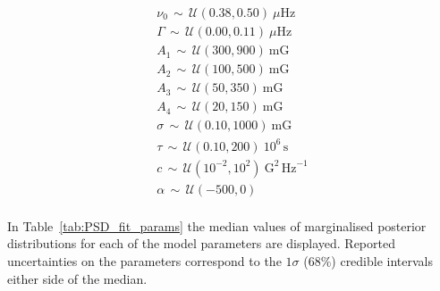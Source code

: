 \begin{gather*}
%
\nu_0 \, \sim \,\mathcal{U}(0.38, 0.50) \> \mu\mathrm{Hz} \\
%
\Gamma \, \sim \,\mathcal{U}(0.00, 0.11)  \> \mu\mathrm{Hz} \\
%
A_1 \, \sim \,\mathcal{U}(300, 900)  \> \mathrm{mG} \\
%
A_2 \, \sim \,\mathcal{U}(100, 500)  \> \mathrm{mG} \\
%
A_3 \, \sim \,\mathcal{U}(50, 350)  \> \mathrm{mG} \\
%
A_4 \, \sim \,\mathcal{U}(20, 150)  \> \mathrm{mG} \\
%
\sigma \, \sim \,\mathcal{U}(0.10, 1000)  \> \mathrm{mG} \\
%
\tau \, \sim \,\mathcal{U}(0.10, 200)  \> 10^6 \, \mathrm{s} \\
%
c \, \sim \,\mathcal{U}(10^{-2}, 10^{2})  \> \mathrm{G}^2 \, \mathrm{Hz}^{-1} \\
%
\alpha \, \sim \,\mathcal{U}(-500, 0)\\
\end{gather*}


In Table~\ref{tab:PSD_fit_params} the median values of marginalised posterior distributions for each of the model parameters are displayed. Reported uncertainties on the parameters correspond to the $1\sigma$ ($68 \%$) credible intervals either side of the median.

